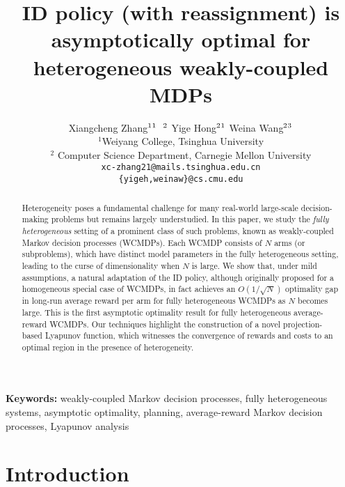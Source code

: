 \documentclass[11pt,letterpaper]{article}
\author{%
Xiangcheng Zhang$^{1}\footnotemark[1] ~~\footnotemark[2]$ \quad Yige Hong$^{2}\footnotemark[1]$ \quad  Weina Wang$^{2}\footnotemark[3]$   \medskip\\
$^1$Weiyang College, Tsinghua University  \\ $^2$ Computer Science Department, Carnegie Mellon University \\
\texttt{xc-zhang21@mails.tsinghua.edu.cn}\\
\texttt{\{yigeh,weinaw\}@cs.cmu.edu}
}
\title{ID policy (with reassignment) is asymptotically optimal for heterogeneous weakly-coupled MDPs}
\date{}
\renewcommand{\thefootnote}{\fnsymbol{footnote}}
\begin{document}
\maketitle

\renewcommand{\thefootnote}{\arabic{footnote}}
\setcounter{footnote}{0}


\begin{abstract}%
Heterogeneity poses a fundamental challenge for many real-world large-scale decision-making problems but remains largely understudied.
In this paper, we study the \emph{fully heterogeneous} setting of a prominent class of such problems, known as weakly-coupled Markov decision processes (WCMDPs).
Each WCMDP consists of $N$ arms (or subproblems), which have distinct model parameters in the fully heterogeneous setting, leading to the curse of dimensionality when $N$ is large.
We show that, under mild assumptions, a natural adaptation of the ID policy, although originally proposed for a homogeneous special case of WCMDPs, in fact achieves an $O(1/\sqrt{N})$ optimality gap in long-run average reward per arm for fully heterogeneous WCMDPs as $N$ becomes large.
This is the first asymptotic optimality result for fully heterogeneous average-reward WCMDPs.
Our techniques highlight the construction of a novel projection-based Lyapunov function, which witnesses the convergence of rewards and costs to an optimal region in the presence of heterogeneity.
\end{abstract}



\noindent \small\textbf{Keywords:} 
weakly-coupled Markov decision processes, fully heterogeneous systems, asymptotic optimality, planning, average-reward Markov decision processes, Lyapunov analysis





\tableofcontents

\section{Introduction}
\end{document}
